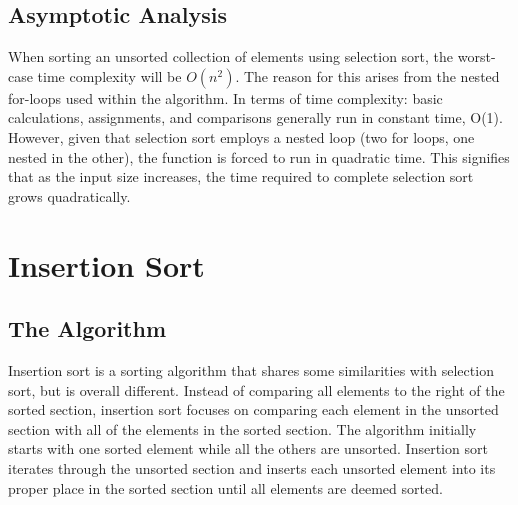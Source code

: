 \documentclass[letterpaper, 10pt,DIV=13]{scrartcl}
\numberwithin{equation}{section} %
\numberwithin{figure}{section} %
\numberwithin{table}{section} %
\begin{document}
\subsection{Asymptotic Analysis}
When sorting an unsorted collection of elements using selection sort, the worst-case time complexity will be $O(n^2)$. The reason for this arises from the nested for-loops used within the algorithm. In terms of time complexity: basic calculations, assignments, and comparisons generally run in constant time, O(1). However, given that selection sort employs a nested loop (two for loops, one nested in the other), the function is forced to run in quadratic time. This signifies that as the input size increases, the time required to complete selection sort grows quadratically.


\pagebreak

\section{Insertion Sort}

\subsection{The Algorithm}
Insertion sort is a sorting algorithm that shares some similarities with selection sort, but is overall different. Instead of comparing all elements to the right of the sorted section, insertion sort focuses on comparing each element in the unsorted section with all of the elements in the sorted section. The algorithm initially starts with one sorted element while all the others are unsorted. Insertion sort iterates through the unsorted section and inserts each unsorted element into its proper place in the sorted section until all elements are deemed sorted.
\end{document}
